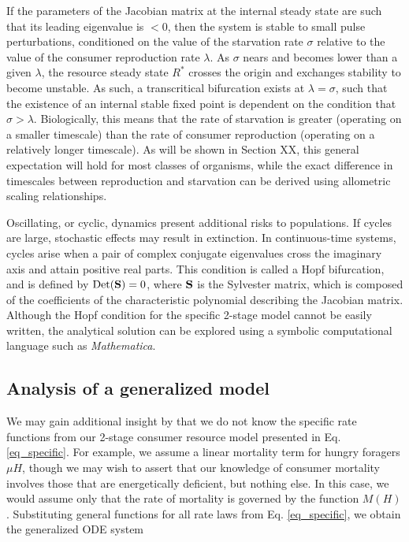 \documentclass[12pt,english]{article}
\begin{document}
\begin{spacing}{1.9}
If the parameters of the Jacobian matrix at the internal steady state are such that its leading eigenvalue is $<0$, then the system is stable to small pulse perturbations, conditioned on the value of the starvation rate $\sigma$ relative to the value of the consumer reproduction rate $\lambda$.
As $\sigma$ nears and becomes lower than a given $\lambda$, the resource steady state $R^*$ crosses the origin and exchanges stability to become unstable.
As such, a transcritical bifurcation exists at $\lambda = \sigma$, such that the existence of an internal stable fixed point is dependent on the condition that $\sigma > \lambda$.
Biologically, this means that the rate of starvation is greater (operating on a smaller timescale) than the rate of consumer reproduction (operating on a relatively longer timescale).
As will be shown in Section XX, this general expectation will hold for most classes of organisms, while the exact difference in timescales between reproduction and starvation can be derived using allometric scaling relationships.


Oscillating, or cyclic, dynamics present additional risks to populations.
If cycles are large, stochastic effects may result in extinction.
In continuous-time systems, cycles arise when a pair of complex conjugate eigenvalues cross the imaginary axis and attain positive real parts.
This condition is called a Hopf bifurcation, and is defined by ${\rm Det}({\bf S}) = 0$, where $\bf S$ is the Sylvester matrix, which is composed of the coefficients of the characteristic polynomial describing the Jacobian matrix.
Although the Hopf condition for the specific 2-stage model cannot be easily written, the analytical solution can be explored using a symbolic computational language such as \emph{Mathematica}.


\subsection{Analysis of a generalized model}

We may gain additional insight by that we do not know the specific rate functions from our 2-stage consumer resource model presented in Eq. \ref{eq_specific}.
For example, we assume a linear mortality term for hungry foragers $\mu H$, though we may wish to assert that our knowledge of consumer mortality involves those that are energetically deficient, but nothing else.
In this case, we would assume only that the rate of mortality is governed by the function $M(H)$.
Substituting general functions for all rate laws from Eq. \ref{eq_specific}, we obtain the generalized ODE system


\end{spacing}
\end{document}
